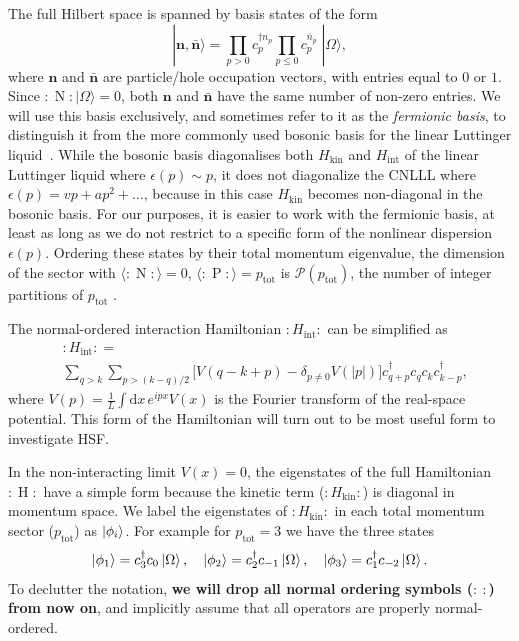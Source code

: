 \documentclass[aps,prx,10pt,twocolumn,amsmath,amssymb,superscriptaddress]{revtex4-2}
\newcommand{\cdag}{c^{\dag}}
\newcommand{\ptot}{p_{\mathrm{tot}}}
\newcommand{\Hint}{H_{\mathrm{int}}}
\newcommand{\groundstate}{|\Omega\rangle}
\theoremstyle{definition}
\theoremstyle{definition}
\begin{document}
The full Hilbert space is spanned by basis states of the form 
\begin{equation}
|\textbf{n}, \bar{\textbf{n}}\rangle = \prod_{p>0}c^{\dag n_p}_p \prod_{p\leq 0}c^{\bar{n}_p}_p \;\groundstate,
\label{eq:ferm_basis}
\end{equation}
where $\textbf{n}$ and $\bar{{\textbf{n}}}$ are particle/hole occupation vectors, with entries equal to $0$ or $1$. Since $:\mathrel{N}:\groundstate = 0$, both $\textbf{n}$ and $\bar{{\textbf{n}}}$ have the same number of non-zero entries. We will use this basis exclusively, and sometimes refer to it as the \emph{fermionic basis}, to distinguish it from the more commonly used bosonic basis for the linear Luttinger liquid~\cite{Haldane_1981}. While the bosonic basis diagonalises both $H_{\mathrm{kin}}$ and $H_{\mathrm{int}}$ of the linear Luttinger liquid where $\epsilon(p) \sim p$, it does not diagonalize the CNLLL where $\epsilon(p) = v p + a p^2 + \dots$, because in this case $H_{\mathrm{kin}}$ becomes non-diagonal in the bosonic basis. For our purposes, it is easier to work with the fermionic basis, at least as long as we do not restrict to a specific form of the nonlinear dispersion $\epsilon(p)$. Ordering these states by their total momentum eigenvalue, the dimension of the sector with $\langle :\mathrel{N}: \rangle = 0$, $\langle :\mathrel{P}: \rangle = \ptot$ is $\mathcal{P}(\ptot)$, the number of integer partitions of $\ptot$ \cite{Haldane_1981, Wright_1965}.

The normal-ordered interaction Hamiltonian $:\mathrel{\Hint}:$ can be simplified as~\cite{Schindler_2022}
\begin{equation} \label{eq:hint}
\begin{aligned}
&:\mathrel{\Hint}: = \\ &\sum_{q>k}\sum_{p>(k-q)/2}\biggl[V(q-k+p) - \delta_{p \neq 0}V(|p|)\biggr]\cdag_{q+p}c_q c_k \cdag_{k-p},
\end{aligned}
\end{equation}
where
$
    V(p) = \frac{1}{L}\int \mathrm{d} x \, e^{ipx}V(x)
$
is the Fourier transform of the real-space potential.
This form of the Hamiltonian will turn out to be most useful form to investigate HSF.

In the non-interacting limit $V(x) = 0$, the eigenstates of the full Hamiltonian $:\mathrel{H}:$ have a simple form because the kinetic term ($:\mathrel{H_{\mathrm{kin}}}:$) is diagonal in momentum space. We label the eigenstates of $:\mathrel{H_{\mathrm{kin}}}:$ in each total momentum sector ($\ptot$) as $\ket{\phi_i}$. For example for $\ptot=3$ we have the three states
\begin{equation}
\ket{\phi_1} = c^\dagger_3 c_0 \ket{\Omega}, \quad \ket{\phi_2} = c^\dagger_2 c_{-1} \ket{\Omega}, \quad \ket{\phi_3} = c^\dagger_1 c_{-2} \ket{\Omega}. 
\label{eq:ptot3_states}
\end{equation}
To declutter the notation, \textbf{we will drop all normal ordering symbols ($:\mathrel{\ }:$) from now on}, and implicitly assume that all operators are properly normal-ordered.
\end{document}
